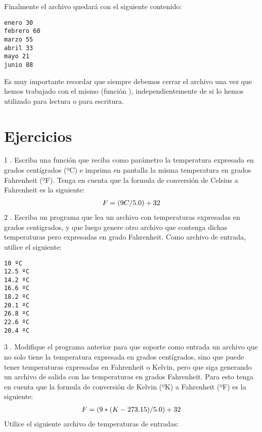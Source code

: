 \documentclass[a4paper,12pt,spanish]{sphinxmanual}
\begin{document}
Finalmente el archivo quedará con el siguiente contenido:

\begin{Verbatim}[commandchars=\\\{\}]
enero 30
febrero 60
marzo 55
abril 33
mayo 21
junio 88
\end{Verbatim}

Es muy importante recordar que siempre debemos cerrar el archivo una vez
que hemos trabajado con el mismo (función ),
independientemente de si lo hemos utilizado para lectura o para
escritura.


\chapter{Ejercicios}
\label{Unidad04-ejercicios:ejercicios}\label{Unidad04-ejercicios::doc}
1 . Escriba una función que reciba como parámetro la temperatura
expresada en grados centígrados (ºC) e imprima en pantalla la misma
temperatura en grados Fahrenheit (ºF). Tenga en cuenta que la formula de
conversión de Celsius a Fahrenheit es la siguiente:
\begin{gather}
\begin{split}F = (9C/5.0) + 32\end{split}\notag
\end{gather}
2 . Escriba un programa que lea un archivo con temperaturas expresadas
en grados centigrados, y que luego genere otro archivo que contenga
dichas temperaturas pero expresadas en grado Fahrenheit. Como archivo de
entrada, utilice el siguiente:

\begin{Verbatim}[commandchars=\\\{\}]
10 ºC
12.5 ºC
14.2 ºC
16.6 ºC
18.2 ºC
20.1 ºC
26.8 ºC
22.6 ºC
20.4 ºC
\end{Verbatim}

3 . Modifique el programa anterior para que soporte como entrada un
archivo que no solo tiene la temperatura expresada en grados
centígrados, sino que puede tener temperaturas expresadas en Fahrenheit
o Kelvin, pero que siga generando un archivo de salida con las
temperaturas en grados Fahrenheit. Para esto tenga en cuenta que la
formula de conversión de Kelvin (ºK) a Fahrenheit (ºF) es la siguiente:
\begin{gather}
\begin{split}F = (9*(K-273.15)/5.0) + 32\end{split}\notag
\end{gather}
Utilice el siguiente archivo de temperaturas de entradas:
\end{document}
